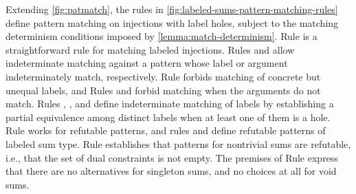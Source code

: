 Extending \autoref{fig:patmatch}, the rules in
\autoref{fig:labeled-sums-pattern-matching-rules} define pattern
matching on injections with label holes, subject to the matching
determinism conditions imposed by \autoref{lemma:match-determinism}.
Rule \MInj is a straightforward rule for matching labeled injections.
Rules \MMInjTag and \MMInjArg allow indeterminate matching against a
pattern whose label or argument indeterminately match, respectively.
Rule \NMInj forbids matching of concrete but unequal labels, and Rules
\NMInjTag and \NMInjArg forbid matching when the arguments do not
match.  Rules \TMMSym, \TMMHole, and \TMMEHole define indeterminate
matching of labels by establishing a partial equivalence among
distinct labels when at least one of them is a hole.  Rule \MMNotIntro
works for refutable patterns, and rules \RInjMult and \RInjSing define
refutable patterns of labeled sum type.  Rule \RInjMult establishes
that patterns for nontrivial sums are refutable, i.e., that the set of
dual constraints is not empty.  The premises of Rule \RInjSing express that there are no alternatives for singleton
sums, and no choices at all for void sums.


